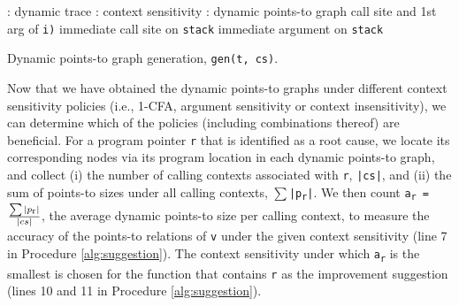\begin{algorithm}[th!]
\begin{algorithmic}[1]
{
\renewcommand{\algorithmicrequire}{\textbf{Input:}}
\renewcommand{\algorithmicensure}{\textbf{Output:}}
: dynamic trace
: context sensitivity
: dynamic points-to graph
 call site and 1st arg of {\tt i)}
 \ENDCASE
{}
 \ENDCASE
 immediate call site on {\tt stack}
  immediate argument on {\tt stack}
\ENDIF
{}
 \ENDCASE
\ENDSWITCH
\ENDWHILE
}
\end{algorithmic}
\caption{Dynamic points-to graph generation, {\tt gen(t, cs)}.}
\label{alg:dyn-pts}
\end{algorithm}

Now that we have obtained the dynamic points-to graphs under different context sensitivity policies (i.e., 1-CFA, argument sensitivity or context insensitivity), we can determine which of the policies (including combinations thereof) are beneficial. For a program pointer {\tt r} that is identified as a root cause, we locate its corresponding nodes via its program location in each dynamic points-to graph, and collect (i) the number of calling contexts associated with {\tt r}, {\tt |cs|}, and (ii) the sum of points-to sizes under all calling contexts, {\tt $\sum$|p\textsubscript{r}|}. We then count {\tt a\textsubscript{r} = $\sum|p\textsubscript{r}|\over |cs|$}, the average dynamic points-to size per calling context, to measure the accuracy of the points-to relations of {\tt v} under the given context sensitivity (line 7 in Procedure \ref{alg:suggestion}). The context sensitivity under which {\tt a\textsubscript{r}} is the smallest is chosen for the function that contains {\tt r} as the improvement suggestion (lines 10 and 11 in Procedure \ref{alg:suggestion}).
